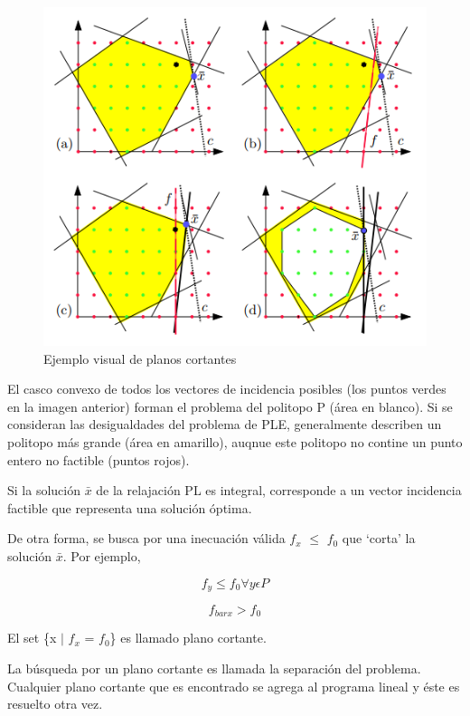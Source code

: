 \documentclass[a4paper]{article}
\begin{document}
\begin{figure}[H]
\centering
\includegraphics[scale=0.4]{Imagenes/ejemplo_planos_cortantes.png}\par
\caption{Ejemplo visual de planos cortantes}
\end{figure}

El casco convexo de todos los vectores de incidencia posibles (los puntos verdes en la imagen anterior) forman el problema del politopo P (área en blanco). Si se consideran las desigualdades del problema de PLE, generalmente describen un politopo más grande (área en amarillo), auqnue este politopo no contine un punto entero no factible (puntos rojos).

Si la solución $\bar{x}$ de la relajación PL es integral, corresponde a un vector incidencia factible que representa una solución óptima.

De otra forma, se busca por una inecuación válida $f_x$ $\leq$ $f_0$ que `corta' la solución $\bar{x}$. Por ejemplo,

\begin{equation}
f_y \leq f_0 \forall y \epsilon P
\end{equation}

\begin{equation}
f_{bar{x}} > f_0
\end{equation}

El set \{x $\mid$ $f_x$ = $f_0$\} es llamado plano cortante.

La búsqueda por un plano cortante es llamada la separación del problema. Cualquier plano cortante que es encontrado se agrega al programa lineal y éste es resuelto otra vez.
\end{document}
